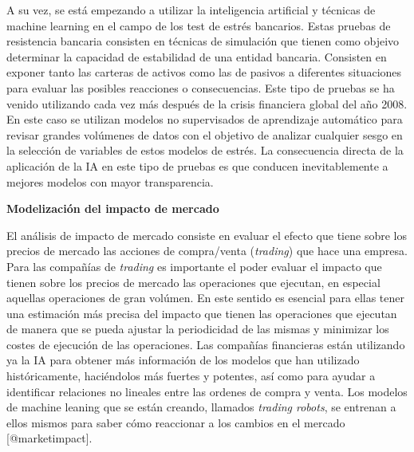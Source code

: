 \documentclass[]{article}
\begin{document}
\setlength\parskip{5ex}

A su vez, se está empezando a utilizar la inteligencia artificial y
técnicas de machine learning en el campo de los test de estrés
bancarios. Estas pruebas de resistencia bancaria consisten en técnicas
de simulación que tienen como objeivo determinar la capacidad de
estabilidad de una entidad bancaria. Consisten en exponer tanto las
carteras de activos como las de pasivos a diferentes situaciones para
evaluar las posibles reacciones o consecuencias. Este tipo de pruebas se
ha venido utilizando cada vez más después de la crisis financiera global
del año 2008. En este caso se utilizan modelos no supervisados de
aprendizaje automático para revisar grandes volúmenes de datos con el
objetivo de analizar cualquier sesgo en la selección de variables de
estos modelos de estrés. La consecuencia directa de la aplicación de la
IA en este tipo de pruebas es que conducen inevitablemente a mejores
modelos con mayor transparencia.

\textbf{Modelización del impacto de mercado}

El análisis de impacto de mercado consiste en evaluar el efecto que
tiene sobre los precios de mercado las acciones de compra/venta
(\emph{trading}) que hace una empresa. Para las compañías de
\emph{trading} es importante el poder evaluar el impacto que tienen
sobre los precios de mercado las operaciones que ejecutan, en especial
aquellas operaciones de gran volúmen. En este sentido es esencial para
ellas tener una estimación más precisa del impacto que tienen las
operaciones que ejecutan de manera que se pueda ajustar la periodicidad
de las mismas y minimizar los costes de ejecución de las operaciones.
Las compañías financieras están utilizando ya la IA para obtener más
información de los modelos que han utilizado históricamente, haciéndolos
más fuertes y potentes, así como para ayudar a identificar relaciones no
lineales entre las ordenes de compra y venta. Los modelos de machine
leaning que se están creando, llamados \emph{trading robots}, se
entrenan a ellos mismos para saber cómo reaccionar a los cambios en el
mercado {[}@marketimpact{]}.

\setlength\parskip{5ex}
\end{document}
